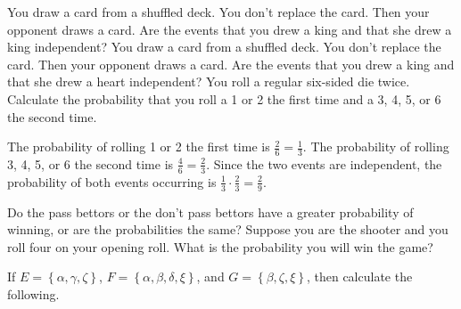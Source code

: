 \documentclass[answers,12pt]{exam}
\begin{document}
\begin{questions}
\question You draw a card from a shuffled deck. You don't replace
the card. Then your opponent draws a card. Are the events that
you drew a king and that she drew a king independent?
\question You draw a card from a shuffled deck. You don't replace
the card. Then your opponent draws a card. Are the events that
you drew a king and that she drew a heart independent?
\question You roll a regular six-sided die twice. Calculate
the probability that you roll a 1 or 2 the first time and a
3, 4, 5, or 6 the second time.
\begin{solution} The probability of rolling 1 or 2 the first
time is $\frac{2}{6}=\frac{1}{3}$.
The probability of rolling 3, 4, 5, or 6 the second time
is $\frac{4}{6}=\frac{2}{3}$.
Since the two events are independent, the probability of both
events occurring is $\frac{1}{3}\cdot\frac{2}{3}=\frac{2}{9}$. \end{solution}

\question Do the pass bettors or the don't pass bettors have
a greater probability of winning, or are the probabilities the same?
\question Suppose you are the shooter and you roll four on your opening
roll. What is the probability you will win the game?

\question If $E=\left\{\alpha,\gamma,\zeta\right\}$,
$F=\left\{\alpha,\beta,\delta,\xi\right\}$, and
$G=\left\{\beta,\zeta,\xi\right\}$, then calculate the following.
\end{questions}
\end{document}
